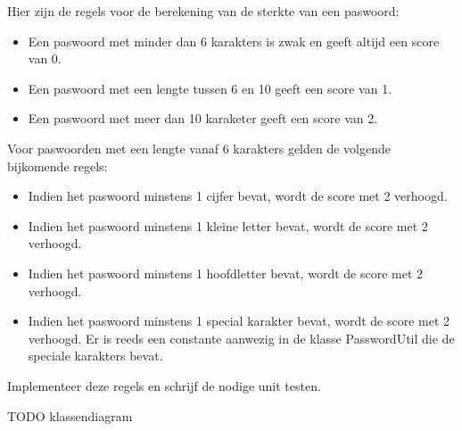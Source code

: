 \begin{oefening}
Hier zijn de regels voor de berekening van de sterkte van een paswoord:
\begin{itemize}
\item Een paswoord met minder dan 6 karakters is zwak en geeft altijd een score van 0.
\item Een paswoord met een lengte tussen 6 en 10 geeft een score van 1.
\item Een paswoord met meer dan 10 karaketer geeft een score van 2.
\end{itemize}
Voor paswoorden met een lengte vanaf 6 karakters gelden de volgende bijkomende regels:
\begin{itemize}
\item Indien het paswoord minstens 1 cijfer bevat, wordt de score met 2 verhoogd.
\item Indien het paswoord minstens 1 kleine letter bevat, wordt de score met 2 verhoogd.
\item Indien het paswoord minstens 1 hoofdletter bevat, wordt de score met 2 verhoogd.
\item Indien het paswoord minstens 1 special karakter bevat, wordt de score met 2 verhoogd. Er is reeds een constante aanwezig in de klasse PasswordUtil die de speciale karakters bevat.
\end{itemize}
Implementeer deze regels en schrijf de nodige unit testen.
\end{oefening}

TODO klassendiagram